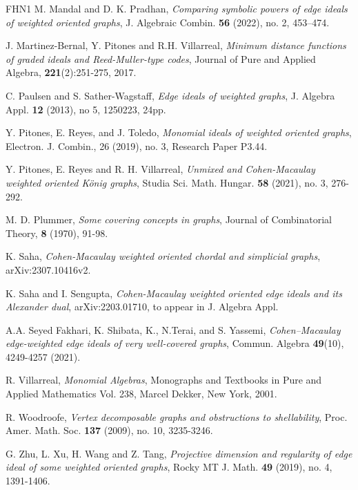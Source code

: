 \documentclass[12pt, amscd]{amsart}
\theoremstyle{definition}
\newcommand{\0}{\bold{0}}
\begin{document}
\begin{thebibliography}{FHN1}
  M. Mandal and D. K. Pradhan, {\it Comparing symbolic powers of edge ideals of weighted oriented graphs}, J. Algebraic Combin. {\bf 56} (2022), no. 2, 453–474.

 J. Martinez-Bernal, Y. Pitones and R.H. Villarreal, {\it Minimum distance functions of graded ideals and Reed-Muller-type codes}, Journal of Pure and Applied Algebra, {\bf 221}(2):251-275, 2017.

 C. Paulsen and S. Sather-Wagstaff,  {\it Edge ideals of weighted graphs},  J. Algebra Appl. {\bf 12} (2013), no 5, 1250223, 24pp.

 Y. Pitones, E. Reyes, and J. Toledo, {\it Monomial ideals of weighted oriented graphs}, Electron. J. Combin., 26 (2019), no. 3, Research Paper P3.44.

 Y. Pitones, E. Reyes and R. H. Villarreal, {\it Unmixed and Cohen-Macaulay weighted oriented K\"{o}nig graphs}, Studia Sci. Math. Hungar. {\bf 58} (2021), no. 3, 276-292.

 M. D. Plummer, {\it Some covering concepts in graphs}, Journal of Combinatorial Theory, {\bf 8} (1970), 91-98.

 K. Saha, {\it Cohen-Macaulay weighted oriented chordal and simplicial graphs}, arXiv:2307.10416v2.

 K. Saha and I. Sengupta, {\it Cohen-Macaulay weighted oriented edge ideals and its Alexander dual}, 	arXiv:2203.01710, to appear in J. Algebra Appl.

 A.A.  Seyed Fakhari,  K.  Shibata, K.,  N.Terai,  and S.  Yassemi,  {\it Cohen–Macaulay edge-weighted edge ideals of very well-covered graphs},   Commun. Algebra {\bf 49}(10), 4249-4257 (2021).

 R. Villarreal, {\it Monomial Algebras}, Monographs and Textbooks in Pure and Applied Mathematics Vol. 238, Marcel Dekker, New York, 2001.

 R. Woodroofe, {\it Vertex decomposable graphs and obstructions to shellability}, Proc. Amer. Math. Soc. {\bf 137} (2009), no. 10, 3235-3246.

 G. Zhu, L. Xu, H. Wang and Z. Tang, {\it Projective dimension and regularity of edge ideal of some weighted oriented graphs}, Rocky MT J. Math. {\bf 49} (2019), no. 4, 1391-1406.

\end{thebibliography}
\end{document}
